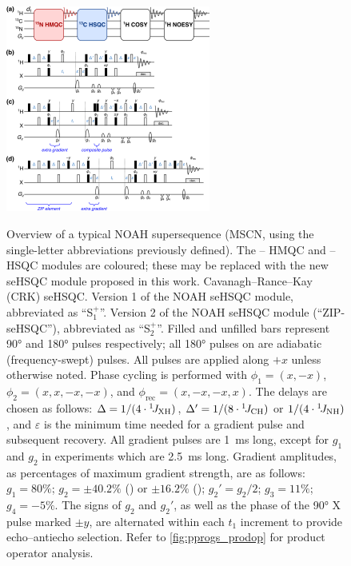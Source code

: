 \documentclass[11pt]{article}
\newcommand*{\noahSpa}{S$^+_1$}
\newcommand*{\noahSpb}{S$^+_2$}
\newcommand*{\carbon}{\ce{^{13}C}}
\newcommand*{\proton}{\ce{^{1}H}}
\newcommand*{\nitrogen}{\ce{^{15}N}}
\newcommand*{\onejxh}{{}^{1}\!J_{\ce{XH}}}
\newcommand*{\onejch}{{}^{1}\!J_{\ce{CH}}}
\newcommand*{\onejnh}{{}^{1}\!J_{\ce{NH}}}
\begin{document}
\begin{refsection}
\begin{figure}
    \centering
    \includegraphics[width=0.6\textwidth]{pprogs.png}
    {\label{fig:pprogs_overview}}
    {\label{fig:pprogs_crk}}
    {\label{fig:pprogs_spv1}}
    {\label{fig:pprogs_spv2}}
    \caption{
        \textbf{} Overview of a typical NOAH supersequence (MSCN, using the single-letter abbreviations previously defined\autocite{Kupce2017ACIE}).
        The \nitrogen{}--\proton{} HMQC and \carbon{}--\proton{} HSQC modules are coloured; these may be replaced with the new seHSQC module proposed in this work.
        \textbf{} Cavanagh--Rance--Kay (CRK) seHSQC.\autocite{sehsqc}
        \textbf{} Version 1 of the NOAH seHSQC module, abbreviated as ``\noahSpa{}''.
        \textbf{} Version 2 of the NOAH seHSQC module (``ZIP-seHSQC''), abbreviated as ``\noahSpb{}''.
        Filled and unfilled bars represent \ang{90} and \ang{180} pulses respectively; all \ang{180} pulses on \carbon{} are adiabatic (frequency-swept) pulses.
        All pulses are applied along $+x$ unless otherwise noted.
        Phase cycling is performed with $\phi_1 = (x, -x)$, $\phi_2 = (x, x, -x, -x)$, and $\phi_{\mathrm{rec}} = (x, -x, -x, x)$.
        The delays are chosen as follows: $\Delta = 1/(4\cdot\onejxh)$, $\Delta' = 1/(8\cdot\onejch)$ or $1/(4\cdot\onejnh)$, and $\varepsilon$ is the minimum time needed for a gradient pulse and subsequent recovery.
        All gradient pulses are \SI{1}{\ms} long, except for $g_1$ and $g_2$ in \nitrogen{} experiments which are \SI{2.5}{\ms} long.
        Gradient amplitudes, as percentages of maximum gradient strength, are as follows: $g_1 = 80\%$; $g_2 = \pm 40.2\%$ (\carbon{}) or $\pm 16.2\%$ (\nitrogen{}); ${g_2}' = g_2/2$; $g_3 = 11\%$; $g_4 = -5\%$.
        The signs of $g_2$ and ${g_2}'$, as well as the phase of the \ang{90} X pulse marked $\pm y$, are alternated within each $t_1$ increment to provide echo--antiecho selection.
        Refer to \cref{fig:pprogs_prodop} for product operator analysis.
    }
    \label{fig:pprogs}
\end{figure}


\end{refsection}
\end{document}
